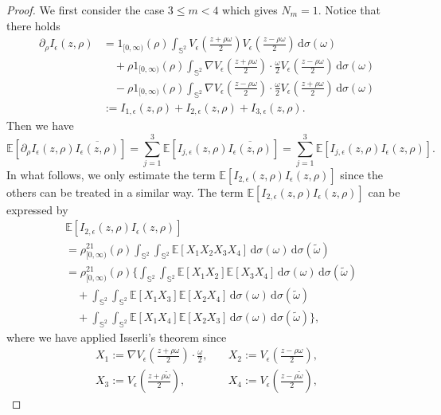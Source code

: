 \documentclass[reqno, 12pt]{amsart}
\numberwithin{equation}{section}
\begin{document}
\begin{proof}
We first consider the case $3 \le m <4$ which gives $N_m=1$.
Notice that there holds \begin{align*}
	\partial_\rho I_\epsilon(z,\rho) &=1_{[0,\infty)}(\rho)\int_{\mathbb{S}^2}V_\epsilon\left(\frac{z+\rho \omega}{2}\right)V_\epsilon\left(\frac{z-\rho\omega}{2}\right)\,\mathrm{d}\sigma(\omega)\\ &\quad+\rho 1_{[0,\infty)}(\rho)\int_{\mathbb{S}^2}\nabla V_\epsilon\left(\frac{z+\rho \omega}{2}\right)\cdot \frac{\omega}{2}V_\epsilon\left(\frac{z-\rho\omega}{2}\right)\,\mathrm{d}\sigma(\omega)\\ &\quad-\rho 1_{[0,\infty)}(\rho)\int_{\mathbb{S}^2}\nabla V_\epsilon\left(\frac{z-\rho \omega}{2}\right)\cdot \frac{\omega}{2}V_\epsilon\left(\frac{z+\rho\omega}{2}\right)\,\mathrm{d}\sigma(\omega)\\ &:= I_{1,\epsilon}(z,\rho)+I_{2,\epsilon}(z,\rho)+I_{3,\epsilon}(z,\rho).
\end{align*} Then we have \[\mathbb E [ \partial_\rho I_\epsilon(z,\rho)\overline{I_\epsilon(z,\rho)}]=\sum_{j=1}^3\mathbb{E} [I_{j,\epsilon}(z,\rho)\overline{I_{\epsilon}(z,\rho)}]=\sum_{j=1}^3\mathbb{E} [I_{j,\epsilon}(z,\rho){I_{\epsilon}(z,\rho)}].\]
In what follows, we only estimate the term $\mathbb{E} [I_{2,\epsilon}(z,\rho)I_{\epsilon}(z,\rho)]$ since the others can be treated in a similar way. The term $\mathbb{E} [I_{2,\epsilon}(z,\rho)I_{\epsilon}(z,\rho)]$ can be expressed by \begin{align*}
	&\mathbb{E} [I_{2,\epsilon}(z,\rho)I_{\epsilon}(z,\rho)] \\
	&=\rho^21_{[0,\infty)}(\rho)  \int_{\mathbb{S}^2}\int_{\mathbb{S}^2}\mathbb{E}[X_1X_2X_3X_4]\,\mathrm{d}\sigma(\omega)\,\mathrm{d}\sigma(\tilde{\omega}) \\ &=\rho^21_{[0,\infty)}(\rho)\Big\{\int_{\mathbb{S}^2}\int_{\mathbb{S}^2}\mathbb{E}[X_1X_2] \mathbb E [X_3X_4]\,\mathrm{d}\sigma(\omega)\,\mathrm{d}\sigma(\tilde{\omega}) \\&\quad+ \int_{\mathbb{S}^2}\int_{\mathbb{S}^2}\mathbb{E}[X_1X_3]\mathbb E [ X_2X_4]\,\mathrm{d}\sigma(\omega)\,\mathrm{d}\sigma(\tilde{\omega})\\&\quad+ \int_{\mathbb{S}^2}\int_{\mathbb{S}^2}\mathbb{E}[X_1X_4]\mathbb E [ X_2X_3]\,\mathrm{d}\sigma(\omega)\,\mathrm{d}\sigma(\tilde{\omega})\Big\},
\end{align*} where we have applied Isserli's theorem \cite{Caro} since 
\begin{align*}
	X_1:=\nabla V_\epsilon\left(\frac{z+\rho \omega}{2}\right)\cdot \frac{\omega}{2},& \quad X_2:=V_\epsilon\left(\frac{z-\rho\omega}{2}\right),\\  X_3:= V_\epsilon\left(\frac{z+\rho \tilde{\omega}}{2}\right),& \quad X_4:=V_\epsilon\left(\frac{z-\rho\tilde{\omega}}{2}\right),

\end{align*}
\end{proof}
\end{document}
